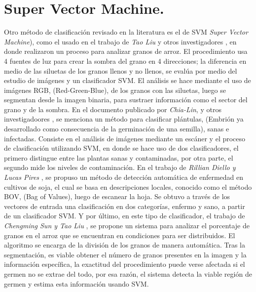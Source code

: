 \section{Super Vector Machine.}
Otro método de clasificación revisado en la literatura es el de SVM \textit{Super Vector Machine}), como el usado en el trabajo de \textit{Tao Liu} y otros investigadores \cite{LIU201679}, en donde realizaron un proceso para analizar granos de arroz. El procedimiento usa 4 fuentes de luz para crear la sombra del grano en 4 direcciones; la diferencia en medio de las siluetas de los granos llenos y no llenos, se evalúa por medio del estudio de imágenes y un clasificador SVM. El análisis se hace mediante el uso de imágenes RGB, (Red-Green-Blue), de los granos con las siluetas, luego se segmentan desde la imagen binaria, para sustraer información como el sector del grano y de la sombra. En el documento publicado por \textit{Chia-Lin}, y otros investigadoores \cite{CHUNG2016404}, se menciona un método para clasificar plántulas, (Embrión ya desarrollado como consecuencia de la germinación de una semilla), sanas e infectadas. Consiste en el análisis de imágenes mediante un escáner y el proceso de clasificación utilizando SVM, en donde se hace uso de dos clasificadores, el primero distingue entre las plantas sanas y contaminadas, por otra parte, el segundo mide los niveles de contaminación. En el trabajo de \textit{Rillian Diello y Lucas Pires} \cite{PIRES201648}, se propuso un método de detección automática de enfermedad en cultivos de soja, el cual se basa en descripciones locales, conocido como el método BOV, (Bag of Values), luego de escanear la hoja. Se obtuvo a través de los vectores de entrada una clasificación en dos categorías, enfermo y sano, a partir de un clasificador SVM. Y por último, en este tipo de clasificador, el trabajo de \textit{Chengming Sun y Tao Liu} \cite{SUN2014426}, se propone un sistema para analizar el porcentaje de granos en el arroz que se encuentran en condiciones para ser distribuidos. El algoritmo se encarga de la división de los granos de manera automática. Tras la segmentación, es viable obtener el número de granos presentes en la imagen y la información específica, la exactitud del procedimiento puede verse afectada si el germen no se extrae del todo, por esa razón, el sistema detecta la viable región de germen y estima esta información usando SVM.\\

